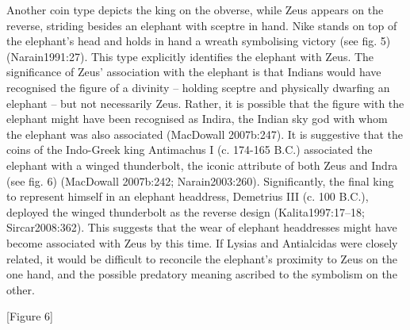 \documentclass{ijsra}
\begin{document}
Another coin type depicts the king on the obverse, while Zeus appears on the reverse, striding besides an elephant with sceptre in hand. 
Nike stands on top of the elephant’s head and holds in hand a wreath symbolising victory (see fig. 5) (Narain1991:27). 
This type explicitly identifies the elephant with Zeus. 
The significance of Zeus’ association with the elephant is that Indians would have recognised the figure of a divinity
– holding sceptre and physically dwarfing an elephant – but not necessarily Zeus. 
Rather, it is possible that the figure with the elephant might have been recognised as Indira,
the Indian sky god with whom the elephant was also associated (MacDowall 2007b:247). 
It is suggestive that the coins of the Indo-Greek king Antimachus I (c. 174-165 B.C.) associated the elephant with a winged thunderbolt,
the iconic attribute of both Zeus and Indra (see fig. 6) (MacDowall 2007b:242; Narain2003:260). 
Significantly, the final king to represent himself in an elephant headdress, Demetrius III (c. 100 B.C.),
deployed the winged thunderbolt as the reverse design (Kalita1997:17–18; Sircar2008:362). 
This suggests that the wear of elephant headdresses might have become associated with Zeus by this time. 
If Lysias and Antialcidas were closely related, it would be difficult to reconcile the elephant’s proximity to Zeus on the one hand,
and the possible predatory meaning ascribed to the symbolism on the other.

[Figure 6]
\end{document}
